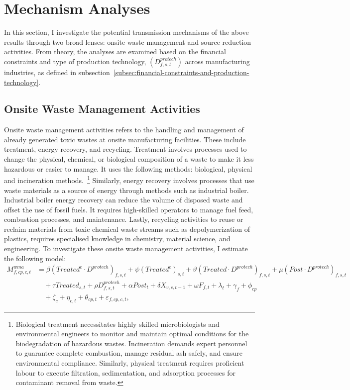 \documentclass[12pt, english]{article}
\begin{document}
    \section{Mechanism Analyses}\label{sec:mechanism-analyses}
    In this section, I investigate the potential transmission mechanisms of the above results through two broad lenses: onsite waste management and source reduction activities. From theory, the analyses are examined based on the financial constraints and type of production technology, $(D^{protech}_{f,s,t})$ across manufacturing industries, as defined in subsection~\ref{subsec:financial-constraints-and-production-technology}.

    \subsection{Onsite Waste Management Activities}\label{subsec:onsite-waste-management-activities}
    Onsite waste management activities refers to the handling and management of already generated toxic wastes at onsite manufacturing facilities. These include treatment, energy recovery, and recycling. Treatment involves processes used to change the physical, chemical, or biological composition of a waste to make it less hazardous or easier to manage. It uses the following methods: biological, physical and incineration methods.~\footnote{\tiny Biological treatment necessitates highly skilled microbiologists and environmental engineers to monitor and maintain optimal conditions for the biodegradation of hazardous wastes. Incineration demands expert personnel to guarantee complete combustion, manage residual ash safely, and ensure environmental compliance. Similarly, physical treatment requires proficient labour to execute filtration, sedimentation, and adsorption processes for contaminant removal from waste.} Similarly, energy recovery involves processes that use waste materials as a source of energy through methods such as industrial boiler. Industrial boiler energy recovery can reduce the volume of disposed waste and offset the use of fossil fuels. It requires high-skilled operators to manage fuel feed, combustion processes, and maintenance. Lastly, recycling activities to reuse or reclaim materials from toxic chemical waste streams such as depolymerization of plastics, requires specialised knowledge in chemistry, material science, and engineering. To investigate these onsite waste management activities, I estimate the following model:
    \begin{align}
        M_{f,cp,c,t}^{wma} &= \beta (Treated^{e} \cdot D^{protech})_{f,s,t} + \psi (Treated^{e})_{s,t} + \vartheta (Treated \cdot D^{protech})_{f,s,t} + \mu (Post \cdot D^{protech})_{f,s,t} \nonumber \\
        &\quad + \tau Treated_{s,t} + \rho D_{f,s,t}^{protech} + \alpha Post_{t} + \delta X_{v,c,t-1} + \omega F_{f,t} + \lambda_{t} + \gamma_{f} + \phi_{cp} \nonumber \\
        &\quad + \zeta_{c} + \eta_{c,t} + \theta_{cp,t} + \varepsilon_{f,cp,c,t},\label{eq:mechanisms-waste-management}
    \end{align}
\end{document}
